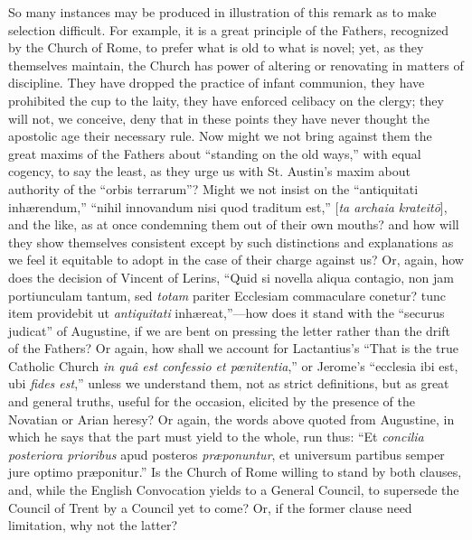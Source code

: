 So many instances may be produced in illustration
of this remark as to make selection difficult. For example, it is a
great principle of the Fathers, recognized by the Church of Rome, to
prefer what is old to what is novel; yet, as they themselves
maintain, the Church has power of altering or renovating in matters of
discipline. They have dropped the practice of infant communion, they
have prohibited the cup to the laity, they have enforced celibacy on
the clergy; they will not, we conceive, deny that in these points they
have never thought the apostolic age their necessary rule. Now might
we not bring against them the great maxims of the Fathers about ``standing on the old ways,'' with equal cogency, to say the least,
as they urge us with St. Austin's maxim about authority of the
``orbis terrarum''? Might we not insist on the ``antiquitati
inhærendum,''
``nihil innovandum nisi quod traditum est,'' [\emph{ta archaia
krateit\={o}}], and the like, as at once condemning them out of
their own mouths? and how will they show themselves consistent except
by such distinctions and explanations as we feel it equitable to adopt
in the case of their charge against us? Or, again, how does the
decision of Vincent of Lerins, ``Quid si novella aliqua contagio, non
jam portiunculam tantum, sed \emph{totam} pariter Ecclesiam
commaculare conetur? tunc item providebit ut \emph{antiquitati}
inhæreat,''—how
does it stand with the ``securus judicat'' of Augustine, if we are
bent on pressing the letter rather than the drift of the Fathers? Or
again, how shall we account for Lactantius's ``That is the true
Catholic Church \emph{in quâ est confessio et pœnitentia},'' or
Jerome's ``ecclesia ibi est, ubi \emph{fides est},'' unless we
understand them, not as strict definitions, but as great and general
truths, useful for the occasion, elicited by the presence of the
Novatian or Arian heresy? Or again, the words above quoted from
Augustine, in which he says that the part must yield to the whole, run
thus: ``Et \emph{concilia posteriora prioribus} apud posteros \emph{præponuntur},
et universum partibus semper jure optimo præponitur.'' Is the Church
of Rome willing to stand by both clauses, and, while the English
Convocation yields to a General Council, to supersede the Council of
Trent by a Council yet to come? Or, if the former clause need
limitation, why not the latter?

